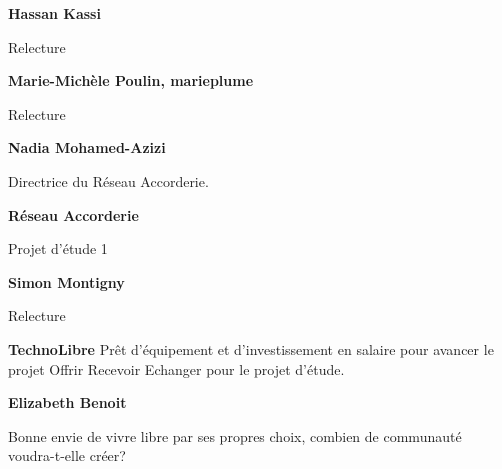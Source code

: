 \textbf{Hassan Kassi}

Relecture

\textbf{Marie-Michèle Poulin, marieplume}

Relecture

\textbf{Nadia Mohamed-Azizi}

Directrice du Réseau Accorderie.

\textbf{Réseau Accorderie}

Projet d’étude 1


\textbf{Simon Montigny}

Relecture

\textbf{TechnoLibre}
Prêt d’équipement et d'investissement en salaire pour avancer le projet Offrir Recevoir Echanger pour le projet d’étude.

\textbf{Elizabeth Benoit}

Bonne envie de vivre libre par ses propres choix, combien de communauté voudra-t-elle créer?
